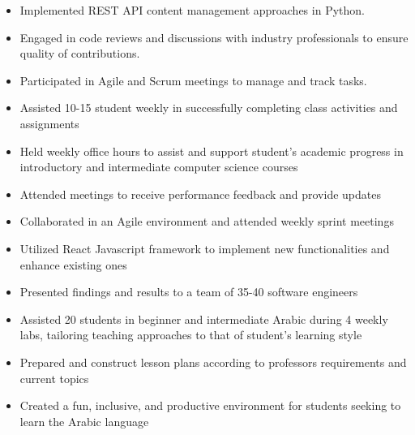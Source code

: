 \begin{itemize}
    \item Implemented REST API content management approaches in Python.
    \item Engaged in code reviews and discussions with industry professionals to
          ensure quality of contributions.
    \item Participated in Agile and Scrum meetings to manage and track tasks.
\end{itemize}
\begin{itemize}
    \item Assisted 10-15  student weekly in successfully completing class
          activities and \\ assignments
    \item Held weekly office hours to assist and support student's academic
          progress in introductory and intermediate computer science courses
    \item Attended meetings to receive performance feedback and provide updates
\end{itemize}
\begin{itemize}
    \item Collaborated in an Agile environment and attended weekly sprint meetings
    \item Utilized React Javascript framework to implement new functionalities
          and \\ enhance existing ones
    \item Presented findings and results to a team of 35-40 software engineers
\end{itemize}
\begin{itemize}
    \item Assisted 20 students in beginner and intermediate Arabic during 4 weekly
          labs, tailoring teaching approaches to that of student’s learning style
    \item Prepared and construct lesson plans according to professors requirements and current topics
    \item Created a fun, inclusive, and productive environment for students seeking to learn the Arabic language
\end{itemize}
